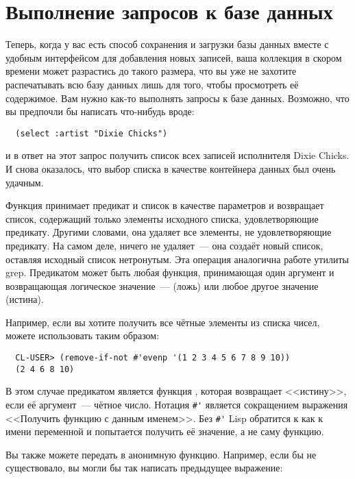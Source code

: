 \section{Выполнение запросов к базе данных}

Теперь, когда у вас есть способ сохранения и загрузки базы данных вместе с удобным
интерфейсом для добавления новых записей, ваша коллекция в скором времени может разрастись
до такого размера, что вы уже не захотите распечатывать всю базу данных лишь для того,
чтобы просмотреть её содержимое. Вам нужно как-то выполнять запросы к базе
данных. Возможно, что вы предпочли бы написать что-нибудь вроде:

\begin{verbatim}
  (select :artist "Dixie Chicks")
\end{verbatim}

и в ответ на этот запрос получить список всех записей исполнителя Dixie Chicks. И снова
оказалось, что выбор списка в качестве контейнера данных был очень удачным.

Функция  принимает предикат и список в качестве параметров и
возвращает список, содержащий только элементы исходного списка, удовлетворяющие
предикату. Другими словами, она удаляет все элементы, не удовлетворяющие предикату. На
самом деле,  ничего не удаляет~--- она создаёт новый список, оставляя
исходный список нетронутым. Эта операция аналогична работе утилиты grep. Предикатом может
быть любая функция, принимающая один аргумент и возвращающая логическое значение~---
 (ложь) или любое другое значение (истина).

Например, если вы хотите получить все чётные элементы из списка чисел, можете использовать
 таким образом:

\begin{verbatim}
  CL-USER> (remove-if-not #'evenp '(1 2 3 4 5 6 7 8 9 10))
  (2 4 6 8 10)
\end{verbatim}

В этом случае предикатом является функция , которая возвращает <<истину>>,
если её аргумент~--- чётное число. Нотация \lstinline!#'! является сокращением выражения
<<Получить функцию с данным именем>>. Без \lstinline!#'! Lisp обратится к  как к
имени переменной и попытается получить её значение, а не саму функцию.

Вы также можете передать в  анонимную функцию. Например, если бы
 не существовало, вы могли бы так написать предыдущее выражение:

